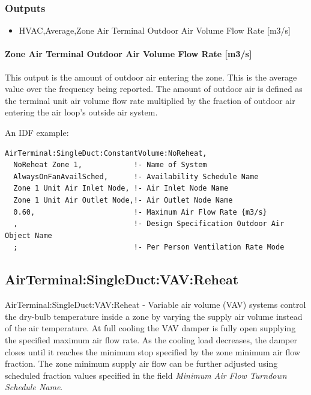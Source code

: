 \subsubsection{Outputs}

\begin{itemize}
\item
  HVAC,Average,Zone Air Terminal Outdoor Air Volume Flow Rate {[}m3/s{]}
\end{itemize}

\paragraph{Zone Air Terminal Outdoor Air Volume Flow Rate {[}m3/s{]}}

This output is the amount of outdoor air entering the zone. This is the average value over the frequency being reported. The amount of outdoor air is defined as the terminal unit air volume flow rate multiplied by the fraction of outdoor air entering the air loop's outside air system.

An IDF example:

\begin{lstlisting}
AirTerminal:SingleDuct:ConstantVolume:NoReheat,
  NoReheat Zone 1,            !- Name of System
  AlwaysOnFanAvailSched,      !- Availability Schedule Name
  Zone 1 Unit Air Inlet Node, !- Air Inlet Node Name
  Zone 1 Unit Air Outlet Node,!- Air Outlet Node Name
  0.60,                       !- Maximum Air Flow Rate {m3/s}
  ,                           !- Design Specification Outdoor Air Object Name
  ;                           !- Per Person Ventilation Rate Mode
\end{lstlisting}

\subsection{AirTerminal:SingleDuct:VAV:Reheat}\label{airterminalsingleductvavreheat}

AirTerminal:SingleDuct:VAV:Reheat - Variable air volume (VAV) systems control the dry-bulb temperature inside a zone by varying the supply air volume instead of the air temperature. At full cooling the VAV damper is fully open supplying the specified maximum air flow rate. As the cooling load decreases, the damper closes until it reaches the minimum stop specified by the zone minimum air flow fraction. The zone minimum supply air flow can be further adjusted using scheduled fraction values specified in the field \textit{Minimum Air Flow Turndown Schedule Name}.

